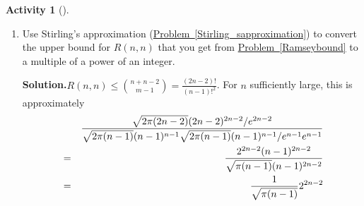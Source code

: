 \documentclass[10pt,]{book}
\theoremstyle{plain}
\theoremstyle{definition}
\newtheorem{activity}[project]{Activity}
\numberwithin{equation}{chapter}
\newcommand{\amp}{&}
\begin{document}
\begin{activity}[]
\begin{enumerate}[label=(\alph*)]
~\par
\item Use Stirling's approximation (\hyperref[Stirling_sapproximation]{Problem~\ref{Stirling_sapproximation}}) to convert the upper bound for \(R(n,n)\) that you get from \hyperref[Ramseybound]{Problem~\ref{Ramseybound}} to a multiple of a power of an integer.%
\par\medskip\noindent%
\textbf{Solution.}\quad \(R(n,n)\le \binom{n+n-2}{m-1}=\frac{(2n-2)!}{(n-1)!^2}\). For \(n\) sufficiently large, this is approximately%
\begin{align*}
\amp \amp \sqrt{2\pi (2n-2)}(2n-2)^{2n-2}/e^{2n-2}\over
\sqrt{2 \pi (n-1)}(n-1)^{n-1}\sqrt{2 \pi
(n-1)}(n-1)^{n-1}/e^{n-1}e^{n-1}\\
\amp =\amp {2^{2n-2}(n-1)^{2n-2}\over\sqrt{\pi
(n-1)}(n-1)^{2n-2}}\\
\amp =\amp \frac{1}{\sqrt{\pi
(n-1)}}2^{2n-2}
\end{align*}
%

\end{enumerate}
\end{activity}
\typeout{************************************************}
\typeout{************************************************}
\end{document}
